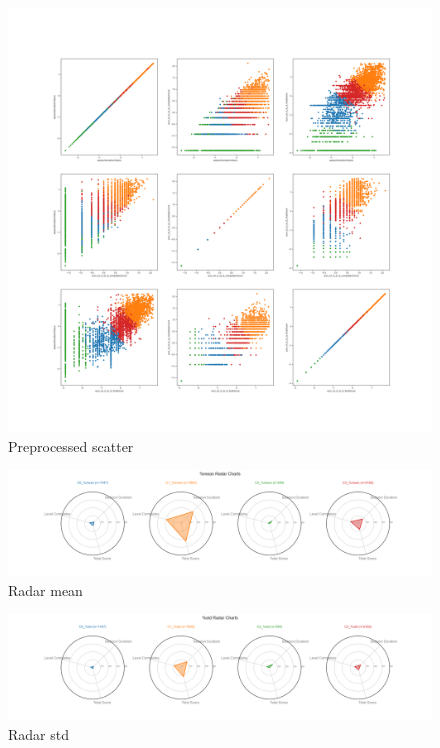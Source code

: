 \documentclass{article}
\begin{document}
\begin{figure}[H]
    \centering
    \includegraphics[width=1\columnwidth]{Crystal/progression_logtransform_zNonepca2k4/Preprocessed Scatter.png}
    \caption{Preprocessed scatter}
    \label{fig:Crystalprogressionpreprocessedscatter}
\end{figure}
\begin{figure}[H]
    \centering
    \includegraphics[width=1\columnwidth]{Crystal/progression_logtransform_zNonepca2k4/radar_mean.png}
    \caption{Radar mean}
    \label{fig:Crystalprogressionradarmean}
\end{figure}
\begin{figure}[H]
    \centering
    \includegraphics[width=1\columnwidth]{Crystal/progression_logtransform_zNonepca2k4/radar_std.png}
    \caption{Radar std}
    \label{fig:Crystalprogressionradarstd}
\end{figure}
\end{document}
